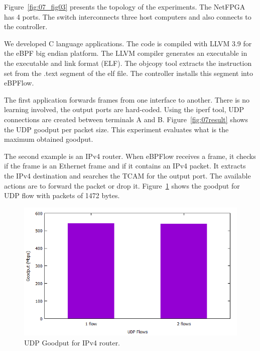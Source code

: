 Figure~\ref{fig:07_fig03} presents the topology of the experiments. The NetFPGA has 4 ports. The switch interconnects three host computers and also connects to the controller.

We developed C language applications. The code is compiled with LLVM 3.9 for the eBPF big endian platform.
The LLVM compiler generates an executable in the executable and link format (ELF).
The objcopy tool extracts the instruction set from the .text segment of the elf file.
The controller installs this segment into eBPFlow.

The first application forwards frames from one interface to another. There is no learning involved, the output ports are hard-coded. Using the iperf tool, UDP connections are created between terminals A and B. Figure~\ref{fig:07result} shows the UDP goodput per packet size. This experiment evaluates what is the maximum obtained goodput.

The second example is an IPv4 router.
When eBPFlow receives a frame, it checks if the frame is an Ethernet frame and if it contains an IPv4 packet. It extracts the IPv4 destination and searches the TCAM for the output port.
The available actions are to forward the packet or drop it.
Figure~\ref{fig:IPv4routerresult} shows the goodput for UDP flow with packets of 1472 bytes.

\begin{figure}[htb]
\centering
\includegraphics[width=1.\linewidth]{figures/ipv4goodput.png}
\caption{UDP Goodput for IPv4 router.}
\label{fig:IPv4routerresult}
\end{figure}



